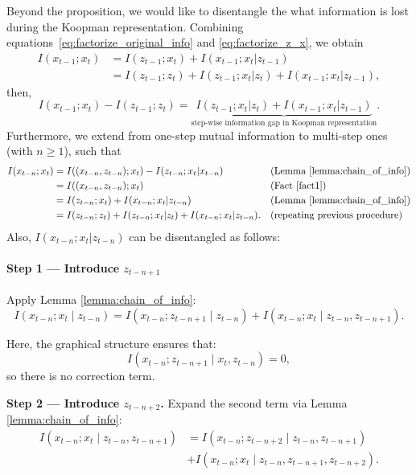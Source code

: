 \documentclass{article} %
\begin{document}
Beyond the proposition, we would like to disentangle the what information is lost during the Koopman representation. Combining equations~\ref{eq:factorize_original_info} and \ref{eq:factorize_z_x}, we obtain 
\begin{equation}
\begin{aligned}
    I(x_{t-1}; x_t) & = I(z_{t-1}; x_t) + I(x_{t-1}; x_t|z_{t-1}) \\
    & = I(z_{t-1}; z_t) + I(z_{t-1}; x_t | z_{t}) + I(x_{t-1}; x_t|z_{t-1}), 
\end{aligned}
\end{equation}
then, 
\begin{equation}
    I(x_{t-1}; x_t) - I(z_{t-1}; z_{t}) = \underbrace{I(z_{t-1}; x_t | z_{t}) + I(x_{t-1}; x_t|z_{t-1})}_{\text{step-wise information gap in Koopman representation}}. 
\end{equation}
Furthermore, we extend from one-step mutual information to multi-step ones (with $n\geq 1$), such that 
\begin{equation} \label{eq:multi_step_info_fact}
\begin{aligned}
        I(x_{t-n}; x_t) & = I((x_{t-n},z_{t-n}); x_t) - I(z_{t-n}; x_t|x_{t-n})  && \text{(Lemma~\ref{lemma:chain_of_info})} \\
        & =  I((x_{t-n},z_{t-n}); x_t) && \text{(Fact~\ref{fact1})} \\
         & =  I(z_{t-n}; x_t) + I(x_{t-n}; x_t|z_{t-n})  && \text{(Lemma~\ref{lemma:chain_of_info})} \\
        & =  I(z_{t-n}; z_t) + I(z_{t-n}; x_t|z_t) + I(x_{t-n}; x_t|z_{t-n}).  && \text{(repeating previous procedure)}
\end{aligned}
\end{equation}
Also, $I(x_{t-n}; x_t|z_{t-n})$ can be disentangled as follows:

\paragraph{Step 1 — Introduce $z_{t-n+1}$}

Apply Lemma \ref{lemma:chain_of_info}:
\[
I(x_{t-n}; x_t \mid z_{t-n})
= I(x_{t-n}; z_{t-n+1} \mid z_{t-n})
+ I(x_{t-n}; x_t \mid z_{t-n}, z_{t-n+1}).
\]

Here, the graphical structure ensures that:
\[
I(x_{t-n}; z_{t-n+1} \mid x_t, z_{t-n}) = 0,
\]
so there is no correction term.


\textbf{Step 2 — Introduce $z_{t-n+2}$.} Expand the second term via Lemma \ref{lemma:chain_of_info}:
\begin{align*}
    I(x_{t-n}; x_t \mid z_{t-n}, z_{t-n+1})
&= I(x_{t-n}; z_{t-n+2} \mid z_{t-n}, z_{t-n+1}) \\
&+ I(x_{t-n}; x_t \mid z_{t-n}, z_{t-n+1}, z_{t-n+2}).
\end{align*}
\end{document}
